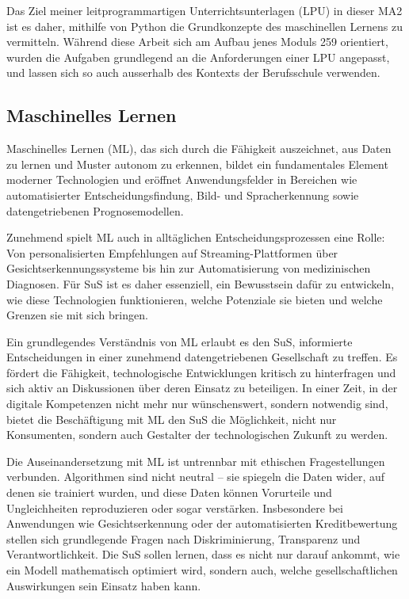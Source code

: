 \documentclass[twocolumn]{article}
\begin{document}
Das Ziel meiner leitprogrammartigen Unterrichtsunterlagen (LPU) in dieser MA2 ist es daher, mithilfe von Python die Grundkonzepte des maschinellen Lernens zu vermitteln. Während diese Arbeit sich am Aufbau jenes Moduls 259 orientiert, wurden die Aufgaben grundlegend an die Anforderungen einer LPU angepasst, und lassen sich so auch ausserhalb des Kontexts der Berufsschule verwenden. 

\subsection{Maschinelles Lernen}
Maschinelles Lernen (ML), das sich durch die Fähigkeit auszeichnet, aus Daten zu lernen und Muster autonom zu erkennen, bildet ein fundamentales Element moderner Technologien und eröffnet Anwendungsfelder in Bereichen wie automatisierter Entscheidungsfindung, Bild- und Spracherkennung sowie datengetriebenen Prognosemodellen.

Zunehmend spielt ML auch in alltäglichen Entscheidungsprozessen eine Rolle: Von personalisierten Empfehlungen auf Streaming-Plattformen über Gesichtserkennungssysteme bis hin zur Automatisierung von medizinischen Diagnosen. Für SuS ist es daher essenziell, ein Bewusstsein dafür zu entwickeln, wie diese Technologien funktionieren, welche Potenziale sie bieten und welche Grenzen sie mit sich bringen.

Ein grundlegendes Verständnis von ML erlaubt es den SuS, informierte Entscheidungen in einer zunehmend datengetriebenen Gesellschaft zu treffen. Es fördert die Fähigkeit, technologische Entwicklungen kritisch zu hinterfragen und sich aktiv an Diskussionen über deren Einsatz zu beteiligen. In einer Zeit, in der digitale Kompetenzen nicht mehr nur wünschenswert, sondern notwendig sind, bietet die Beschäftigung mit ML den SuS die Möglichkeit, nicht nur Konsumenten, sondern auch Gestalter der technologischen Zukunft zu werden.

Die Auseinandersetzung mit ML ist untrennbar mit ethischen Fragestellungen verbunden. Algorithmen sind nicht neutral – sie spiegeln die Daten wider, auf denen sie trainiert wurden, und diese Daten können Vorurteile und Ungleichheiten reproduzieren oder sogar verstärken. Insbesondere bei Anwendungen wie Gesichtserkennung oder der automatisierten Kreditbewertung stellen sich grundlegende Fragen nach Diskriminierung, Transparenz und Verantwortlichkeit. Die SuS sollen lernen, dass es nicht nur darauf ankommt, wie ein Modell mathematisch optimiert wird, sondern auch, welche gesellschaftlichen Auswirkungen sein Einsatz haben kann.
\end{document}
